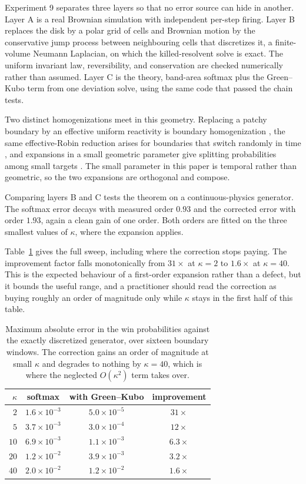 \documentclass[11pt]{article}
\theoremstyle{remark}
\begin{document}
Experiment 9 separates three layers so that no error source can hide in
another. Layer A is a real Brownian simulation with independent per-step
firing. Layer B replaces the disk by a polar grid of cells and Brownian motion by the
conservative jump process between neighbouring cells that discretizes it, a
finite-volume Neumann Laplacian, on which the killed-resolvent solve is exact.
The uniform invariant law, reversibility, and conservation are checked
numerically rather than assumed. Layer C is the theory,
band-area softmax plus the Green--Kubo term from one deviation solve, using the
same code that passed the chain tests.

Two distinct homogenizations meet in this geometry. Replacing a patchy
boundary by an effective uniform reactivity is boundary homogenization
\citep{berezhkovskii2004}, the same effective-Robin reduction arises for
boundaries that switch randomly in time \citep{lawley2015}, and expansions in
a small geometric parameter give splitting probabilities among small targets
\citep{bressloff2020}. The small parameter in this paper is temporal rather
than geometric, so the two expansions are orthogonal and compose.

Comparing layers B and C tests the theorem on a continuous-physics generator.
The softmax error decays with measured order $0.93$ and the corrected error
with order $1.93$, again a clean gain of one order. Both orders are fitted on the three smallest values of $\kappa$, where the
expansion applies.

Table~\ref{tab:kappa} gives the full sweep, including where the correction
stops paying. The improvement factor falls monotonically from $31\times$ at
$\kappa = 2$ to $1.6\times$ at $\kappa = 40$. This is the expected behaviour
of a first-order expansion rather than a defect, but it bounds the useful
range, and a practitioner should read the correction as buying roughly an
order of magnitude only while $\kappa$ stays in the first half of this table.

\begin{table}[t]
  \centering
  \begin{tabular}{rccc}
    \toprule
    $\kappa$ & softmax & with Green--Kubo & improvement \\
    \midrule
    $2$  & $1.6\times10^{-3}$ & $5.0\times10^{-5}$ & $31\times$ \\
    $5$  & $3.7\times10^{-3}$ & $3.0\times10^{-4}$ & $12\times$ \\
    $10$ & $6.9\times10^{-3}$ & $1.1\times10^{-3}$ & $6.3\times$ \\
    $20$ & $1.2\times10^{-2}$ & $3.9\times10^{-3}$ & $3.2\times$ \\
    $40$ & $2.0\times10^{-2}$ & $1.2\times10^{-2}$ & $1.6\times$ \\
    \bottomrule
  \end{tabular}
  \caption{Maximum absolute error in the win probabilities against the exactly
  discretized generator, over sixteen boundary windows. The correction gains an
  order of magnitude at small $\kappa$ and degrades to nothing by
  $\kappa = 40$, which is where the neglected $O(\kappa^2)$ term takes over.}
  \label{tab:kappa}
\end{table}
\end{document}

